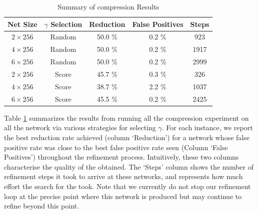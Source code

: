 \begin{table}
\begin{tabular}{|c|c|c|c|c|}
\hline
Net Size     & $\gamma$ Selection & Reduction & False Positives & Steps  \\ 
\hline
$2\times256$ & Random             & 50.0 \%   & 0.2  \%         &  923   \\  
$4\times256$ & Random             & 50.0 \%   & 0.2  \%         & 1917    \\ 
$6\times256$ & Random             & 50.0 \%   & 0.2  \%         & 2999    \\ 
$2\times256$ & Score      & 45.7 \%   & 0.3  \%         &  326    \\ 
$4\times256$ & Score      & 38.7 \%   & 2.2  \%         & 1037    \\ 
$6\times256$ & Score      & 45.5 \%   & 0.2  \%         & 2425    \\ 
\hline
\end{tabular}
\caption{Summary of \mnist compression Results}
\label{t:mnist-compr-summary}
\end{table}

Table \ref{t:mnist-compr-summary} summarizes the results from running all the
compression experiment on all the \mnist network via various strategies for
selecting $\gamma$. For each instance, we report the best reduction
rate achieved (column `Reduction') for a network whose false positive rate was
close to the best false positive rate seen (Column `False Positives')
throughout the refinement process. Intuitively, these two columns characterise
the quality of the \abs obtained. The `Steps' column shows the
number of refinement steps it took to arrive at these networks, and represents
how much effort the search for the \abs took. Note that we currently do
not stop our refinement loop at the precise point where this network is produced
but may continue to refine beyond this point.  


